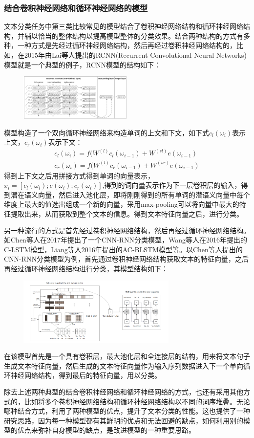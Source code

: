 \documentclass[UTF8]{ctexart}
\begin{document}
\subsubsection{结合卷积神经网络和循环神经网络的模型}
	文本分类任务中第三类比较常见的模型结合了卷积神经网络结构和循环神经网络结构，并辅以恰当的整体结构以提高模型整体的分类效果。结合两种结构的方式有多种，一种方式是先经过循环神经网络结构，然后再经过卷积神经网络结构的，比如，在2015年由Lai等人提出的RCNN(Recurrent Convolutional Neural Networks)模型就是一个典型的例子，RCNN模型的结构如下：
	\begin{figure}[H]
		\centering \includegraphics[width=0.5\textwidth]{RCNN}
	\end{figure}
	模型构造了一个双向循环神经网络来构造单词的上文和下文，如下式$c_l(\omega_i)$表示上文，$c_r(\omega_i)$表示下文：
	\begin{align*}
		c_l(\omega_i) = f(W^{(l)}c_l(\omega_{i-1}) + W^{(sl)}e(\omega_{i-1}) \\
		c_r(\omega_i) = f(W^{(l)}c_r(\omega_{i-1}) + W^{(sr)}e(\omega_{i-1})
	\end{align*}
	得到上下文之后用拼接方式得到单词的向量表示，$x_i = [c_l(\omega_i);e(\omega_i);c_r(\omega_i)]$,得到的词向量表示作为下一层卷积层的输入，得到潜在语义向量，然后进入池化层，即将刚刚得到的所有单词的潜语义向量中每个维度上最大的值选出组成一个新的向量，采用max-pooling可以将向量中最大的特征提取出来，从而获取到整个文本的信息。得到文本特征向量之后，进行分类。
	\par 另一种流行的方式是首先经过卷积神经网络结构，然后再经过循环神经网络结构。如Chen等人在2017年提出了一个CNN-RNN分类模型，Wang等人在2016年提出的C-LSTM模型，Liang等人2016年提出的AC-BLSTM模型等。以Chen等人提出的CNN-RNN分类模型为例，首先通过卷积神经网络结构获取文本的特征向量，之后再经过循环神经网络结构进行分类，其模型结构如下：
	\begin{figure}[H]
		\centering \includegraphics[width=0.7\textwidth]{CRNN}
	\end{figure}
	在该模型首先是一个具有卷积层，最大池化层和全连接层的结构，用来将文本句子生成文本特征向量，然后生成的文本特征向量作为输入序列数据进入下一个单向循环神经网络结构，得到最后的特征向量，用以分类。
	\par 除去上述两种典型的结合卷积神经网络和循环神经网络的方式，也还有采用其他方式的，比如将多个卷积神经网络结构和循环神经网络结构以不同的词序堆叠。无论哪种结合方式，利用了两种模型的优点，提升了文本分类的性能。这也提供了一种研究思路，因为每一种模型都有其鲜明的优点和无法回避的缺点，如何利用别的模型的优点来弥补自身模型的缺点，是改进模型的一种重要思路。
\end{document}
